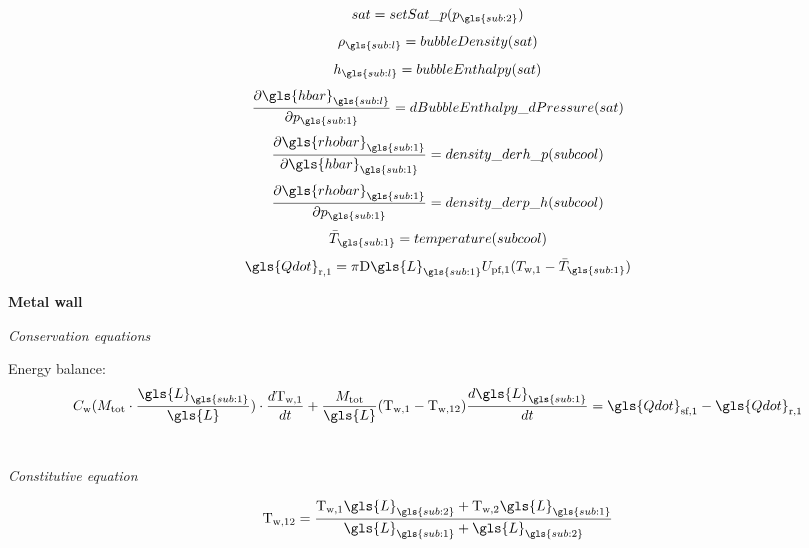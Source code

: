 \documentclass[11pt]{article} %
\begin{document}
\begin{equation}
sat = setSat\_p(p_{\gls{sub:2}})
\end{equation}
\begin{equation}
\rho_{\gls{sub:l}} = bubbleDensity(sat)
\end{equation}
\begin{equation}
h_{\gls{sub:l}} = bubbleEnthalpy(sat)
\end{equation}
\begin{equation}
\frac{\partial \gls{hbar}_{\gls{sub:l}}}{\partial p_{\gls{sub:1}}}= dBubbleEnthalpy\_dPressure(sat)
\end{equation}
\begin{equation}
\frac{\partial \gls{rhobar}_{\gls{sub:1}}}{\partial \gls{hbar}_{\gls{sub:1}}}= density\_derh\_p(subcool)
\end{equation}
\begin{equation}
\frac{\partial \gls{rhobar}_{\gls{sub:1}}}{\partial p_{\gls{sub:1}}}= density\_derp\_h(subcool)
\end{equation}
\begin{equation}
\bar{T}_{\gls{sub:1}} = temperature(subcool)
\end{equation}
\begin{equation}
\gls{Qdot}_\text{r,1} = \pi \text{D} \gls{L}_{\gls{sub:1}} U_\text{pf,1} (T_\text{w,1} - \bar{T}_{\gls{sub:1}})
\end{equation}


{\bf Metal wall}\\
\begin{center}
\textit{Conservation equations}\\
\end{center}

Energy balance:\\

\begin{equation}
C_\text{w}(M_\text{tot} \cdot \frac{\gls{L}_{\gls{sub:1}}}{\gls{L}}) \cdot  \frac{d \text{T}_\text{w,1}}{d t} + \frac{M_\text{tot}}{\gls{L}} (\text{T}_\text{w,1} - \text{T}_\text{w,12})  \frac{d \gls{L}_{\gls{sub:1}}}{d t} = \gls{Qdot}_\text{sf,1} - \gls{Qdot}_\text{r,1}
\end{equation}\\

\begin{center}
\textit{Constitutive equation}\\
\end{center}
\begin{equation}
\text{T}_\text{w,12} = \frac{   \text{T}_\text{w,1} \gls{L}_{\gls{sub:2}}  + \text{T}_\text{w,2}\gls{L}_{\gls{sub:1}}      }{  \gls{L}_{\gls{sub:1}} + \gls{L}_{\gls{sub:2}}         } 
\end{equation}
\end{document}
